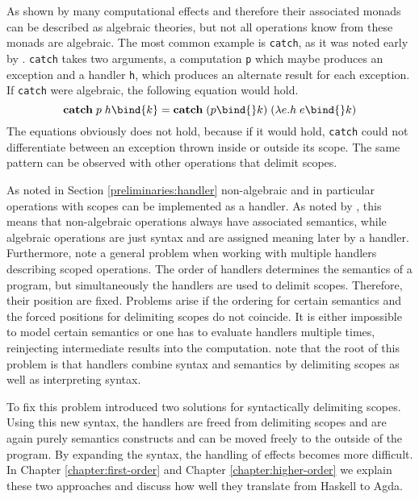 As shown by \textcite{DBLP:conf/fossacs/PlotkinP02} many computational effects
and therefore their associated monads can be described as algebraic theories,
but not all operations know from these monads are algebraic.
The most common example is \texttt{catch}, as it was noted early by
\textcite{DBLP:journals/acs/PlotkinP03}.
\texttt{catch} takes two arguments, a computation \texttt{p} which maybe
produces an exception and a handler \texttt{h}, which produces an alternate
result for each exception.
If \texttt{catch} were algebraic, the following equation would hold.
\[
  \textbf{catch}\; p\; h \bind{k} = \textbf{catch}\;(p\bind{} k)\;(\lambda
  e.h\; e \bind{} k)
\]
The equations obviously does not hold, because if it would hold, \texttt{catch}
could not differentiate between an exception thrown inside or outside its scope.
The same pattern can be observed with other operations that delimit scopes.

As noted in Section \ref{preliminaries:handler} non-algebraic and in particular
operations with scopes can be implemented as a handler.
As noted by \textcite{DBLP:conf/lics/PirogSWJ18}, this means that non-algebraic
operations always have associated semantics, while algebraic operations are just
syntax and are assigned meaning later by a handler.
Furthermore, \textcite{DBLP:conf/haskell/WuSH14} note a general problem when
working with multiple handlers describing scoped operations.
The order of handlers determines the semantics of a program, but simultaneously
the handlers are used to delimit scopes.
Therefore, their position are fixed.
Problems arise if the ordering for certain semantics and the forced positions
for delimiting scopes do not coincide.
It is either impossible to model certain semantics or one has to evaluate
handlers multiple times, reinjecting intermediate results into the
computation.
\textcite{DBLP:conf/haskell/WuSH14} note that the root of this problem is that
handlers combine syntax and semantics by delimiting scopes as well as
interpreting syntax.


To fix this problem \textcite{DBLP:conf/haskell/WuSH14} introduced two solutions
for syntactically delimiting scopes.
Using this new syntax, the handlers are freed from delimiting scopes and are
again purely semantics constructs and can be moved freely to the outside of the
program.
By expanding the syntax, the handling of effects becomes more difficult.
In Chapter \ref{chapter:first-order} and Chapter \ref{chapter:higher-order} we
explain these two approaches and discuss how well they translate from Haskell to
Agda.
